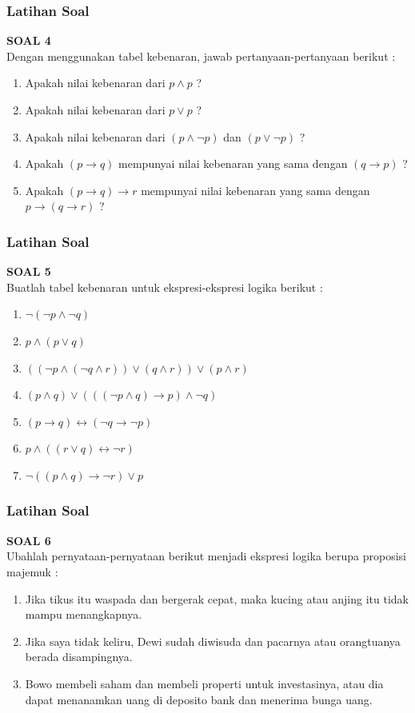 \documentclass[handout]{beamer}
\theoremstyle{definition}
\theoremstyle{example}
\begin{document}
\begin{frame}
	\frametitle{Latihan Soal}
	\textbf{SOAL 4}\\	
	Dengan menggunakan tabel kebenaran, jawab pertanyaan-pertanyaan berikut :\\	 	
	\begin{enumerate}
		\item Apakah nilai kebenaran dari $p \wedge p $ ?
		\item Apakah nilai kebenaran dari $p \vee p $ ?
		\item Apakah nilai kebenaran dari $(p \wedge \neg p) $ dan $(p \vee \neg p)$ ?
		\item Apakah $(p \rightarrow q)$ mempunyai nilai kebenaran yang sama dengan $(q \rightarrow p)$ ?
		\item Apakah $(p \rightarrow q) \rightarrow r$ mempunyai nilai kebenaran yang sama dengan $p \rightarrow (q \rightarrow r)$ ?		
	\end{enumerate}		
\end{frame}

\begin{frame}
	\frametitle{Latihan Soal}
	\textbf{SOAL 5}\\	
	Buatlah tabel kebenaran untuk ekspresi-ekspresi logika berikut :\\	 	
	\begin{enumerate}
		\item $\neg (\neg p \wedge \neg q)$
		\item $p \wedge (p \vee q)$
		\item $((\neg p \wedge (\neg q \wedge r))\vee (q \wedge r))\vee (p \wedge r)$
		\item $(p \wedge q)\vee (((\neg p \wedge q) \rightarrow p)\wedge \neg q)$
		\item $(p \rightarrow q)\leftrightarrow (\neg q \rightarrow \neg p)$		
		\item $p \wedge ((r \vee q) \leftrightarrow \neg r)$	
		\item $\neg((p \wedge q)\rightarrow \neg r)\vee p$	
	\end{enumerate}		
\end{frame}

\begin{frame}
	\frametitle{Latihan Soal}
	\textbf{SOAL 6}\\	
	Ubahlah pernyataan-pernyataan berikut menjadi ekspresi logika berupa proposisi majemuk : \\	 	
	\begin{enumerate}
		\item Jika tikus itu waspada dan bergerak cepat, maka kucing atau anjing itu tidak mampu menangkapnya.
		\item Jika saya tidak keliru, Dewi sudah diwisuda dan pacarnya atau orangtuanya berada disampingnya.
		\item Bowo membeli saham dan membeli properti untuk investasinya, atau dia dapat menanamkan uang di deposito bank dan menerima bunga uang.			
	\end{enumerate}		
\end{frame}
\end{document}
